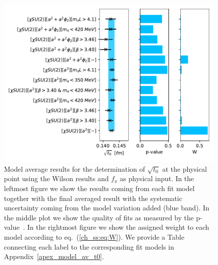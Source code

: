 {\begin{figure}
    \centering
    \includegraphics[width=1.\textwidth]{./cap5/figs/BMA_SU2_w.pdf}
    \caption{Model average results for the determination of $\sqrt{t_0}$ at the physical point using the Wilson results and $f_{\pi}$ as physical input. In the leftmost figure we show the results coming from each fit model together with the final averaged result with the systematic uncertainty coming from the model variation added (blue band). In the middle plot we show the quality of fits as measured by the p-value~\citep{Bruno:2022mfy}. In the rightmost figure we show the assigned weight to each model according to eq.~(\ref{ch_ss:eq:W}). We provide a Table connecting each label to the corresponding fit models in Appendix~\ref{apex_model_av_t0}.}
    \label{ch_ss:fig:BMA_w_SU2}
\end{figure}

}
